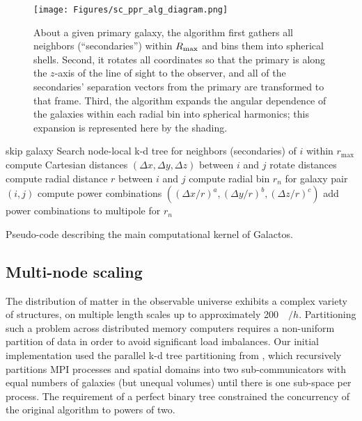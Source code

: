 \begin{figure}
\centering
\texttt{[image: Figures/sc\_ppr\_alg\_diagram.png]}
\caption{About a given primary galaxy, the algorithm first gathers all neighbors (``secondaries'') within $R_{\rm max}$ and bins them into spherical shells. Second, it rotates all coordinates so that the primary is along the $z$-axis of the line of sight to the observer, and all of the secondaries' separation vectors from the primary are transformed to that frame. Third, the algorithm expands the angular dependence of the galaxies within each radial bin into spherical harmonics; this expansion is represented here by the shading. 
\label{fig:alg_flow}}
\end{figure}
\begin{algorithm}
    \SetAlgoLined
     {
         {skip galaxy}
        Search node-local k-d tree for neighbors (secondaries) of $i$ within $r_{\text{max}}$\;
         {
            compute Cartesian distances $(\Delta x, \Delta y, \Delta z)$ between $i$ and $j$\;
            rotate distances\;
            compute radial distance $r$ between $i$ and $j$\;
            compute radial bin $r_n$ for galaxy pair $(i, j)$\;
            compute power combinations $((\Delta x/r)^a, (\Delta y/r)^b, (\Delta z/r)^c)$\;
            add power combinations to multipole for $r_n$\;
        }
    } 
    
    \caption{Pseudo-code describing the main computational kernel of Galactos.}
    \label{algo:3pcf}
\end{algorithm}


\subsection{Multi-node scaling}
\label{subsec:multinode_scaling}

The distribution of matter in the observable universe exhibits a complex variety of structures, on multiple length scales up to approximately \num{200}~\si{\mega\parsec}$/h$.
Partitioning such a problem across distributed memory computers requires a non-uniform partition of data in order to avoid significant load imbalances.
Our initial implementation used the parallel k-d tree partitioning from \cite{patwary2015bd}, which recursively partitions MPI processes and spatial domains into two sub-communicators with equal numbers of galaxies (but unequal volumes) until there is one sub-space per process.
The requirement of a perfect binary tree constrained the concurrency of the original algorithm to powers of two.

